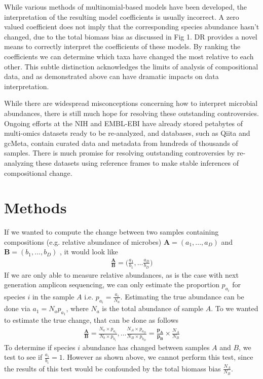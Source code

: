While various methods of multinomial-based models have been developed\cite{Silverman2018-ql,Aijo2018-jp, Grantham2017-gv,Xia2013-nd}, the interpretation of the resulting model coefficients is usually incorrect. A zero valued coefficient does not imply that the corresponding species abundance hasn’t changed, due to the total biomass bias as discussed in Fig 1. DR provides a novel means to correctly interpret the coefficients of these models. By ranking the coefficients we can determine which taxa have changed the most relative to each other. This subtle distinction acknowledges the limits of analysis of compositional data, and as demonstrated above can have dramatic impacts on data interpretation.

While there are widespread misconceptions concerning how to interpret microbial abundances, there is still much hope for resolving these outstanding controversies. Ongoing efforts at the NIH and EMBL-EBI have already stored petabytes of multi-omics datasets ready to be re-analyzed, and databases, such as Qiita and gcMeta, contain curated data and metadata from hundreds of thousands of samples\cite{Gonzalez2018-rv, Shi2018-xe}. There is much promise for resolving outstanding controversies by re-analyzing these datasets using reference frames to make stable inferences of compositional change.

%
%
\section{Methods}
  If we wanted to compute the change between two samples containing compositions (e.g. relative abundance of microbes) $\bm A=(a_1,...,a_D)$ and $\bm B=(b_1,...,b_D)$ , it would look like
  \begin{align}
    \frac{\bm{A}}{\bm{B}}=\big(\frac{a_1}{b_1} ,\ldots  \frac{a_D}{b_D}\big)
  \end{align}
  If we are only able to measure relative abundances, as is the case with next generation amplicon sequencing, we can only estimate the proportion $p_{a_i}$ for species $i$ in the sample $A$  i.e. $p_{a_i}=\frac{a_i}{N_a}$.  Estimating the true abundance can be done via $a_1=N_a p_{a_1}$, where $N_a$ is the total abundance of sample $A$.  To we wanted to estimate the true change, that can be done as follows
  \begin{align}
    \frac{\bm{A}}{\bm{B}} =
    \frac{N_a \times p_{a_1}}{N_b \times p_{b_1}}, \ldots \frac{N_A \times p_{a_D}}{N_B \times p_{b_D}} =
    \frac{\bm{p_A}}{\bm{p_B}} \times  \frac{N_A}{N_B}
  \end{align}
  To determine if species $i$ abundance has changed between samples $A$ and $B$, we test to see if $\frac{a_i}{b_i}=1$. However as shown above, we cannot perform this test, since the results of this test would be confounded by the total biomass bias $\frac{N_A}{N_B}$.

